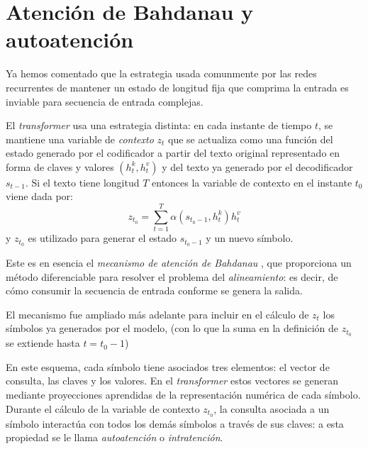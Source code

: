 \section{Atención de Bahdanau y autoatención}
Ya hemos comentado que la estrategia usada comunmente por las redes recurrentes de mantener un estado de longitud fija que comprima la entrada es inviable para secuencia de entrada complejas.

El \textit{transformer} usa una estrategia distinta: en cada instante de tiempo \( t \), se mantiene una variable de \textit{contexto} \( z_t \) que se actualiza como una función del estado generado por el codificador a partir del texto original representado en forma de claves y valores \( (h_{t}^k, h_{t}^v) \) y del texto ya generado por el decodificador \( s_{t-1} \). Si el texto tiene longitud \( T \) entonces la variable de contexto en el instante \( t_0 \) viene dada por:
\[
    z_{t_0} = \sum^{T}_{t = 1} \alpha(s_{t_0 - 1}, h_{t}^k) h_{t}^v
\]
y \( z_{t_0} \) es utilizado para generar el estado \( s_{t_0 - 1} \) y un nuevo símbolo.

Este es en esencia el \textit{mecanismo de atención de Bahdanau} \cite{bahdanau2014neural}, que proporciona un método diferenciable para resolver el problema del \textit{alineamiento}: es decir, de cómo consumir la secuencia de entrada conforme se genera la salida.

El mecanismo fue ampliado más adelante para incluir en el cálculo de \( z_{t} \) los símbolos ya generados por el modelo, (con lo que la suma en la definición de \( z_{t_0} \) se extiende hasta \( t = t_0-1 \))  \cite{chan2015listen}

En este esquema, cada símbolo tiene asociados tres elementos: el vector de consulta, las claves y los valores. En el \textit{transformer} estos vectores se generan mediante proyecciones aprendidas de la representación numérica de cada símbolo. Durante el cálculo de la variable de contexto \( z_{t_0} \), la consulta asociada a un símbolo interactúa con todos los demás símbolos a través de sus claves: a esta propiedad se le llama \textit{autoatención} o \textit{intratención}.
